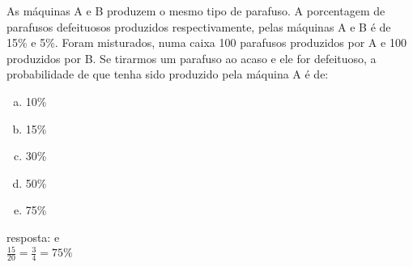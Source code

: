 \begin{ex}
As máquinas A e B produzem o mesmo tipo de parafuso. A porcentagem de parafusos defeituosos produzidos respectivamente, pelas máquinas A e B é de 15\% e 5\%. Foram  misturados, numa caixa 100 parafusos produzidos por A e 100 produzidos por B. Se tirarmos um parafuso ao acaso e ele for defeituoso, a probabilidade de que tenha sido produzido pela máquina A é de:
   \begin{enumerate}[(a)]
   \item 10\%
   \item 15\%
   \item 30\%
   \item 50\%
   \item 75\%
   \end{enumerate}
     \begin{sol}
      resposta: e \\
      $\frac{15}{20}=\frac{3}{4}=75\%$
     \end{sol}
\end{ex}